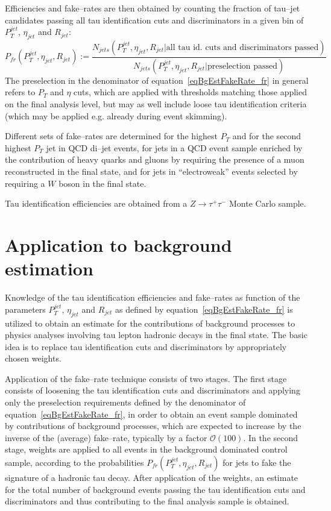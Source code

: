 Efficiencies and fake--rates are then obtained by counting the fraction of tau--jet candidates
passing all tau identification cuts and discriminators
in a given bin of $P_{T}^{jet}$, $\eta_{jet}$ and $R_{jet}$:
\begin{equation}
P_{fr} \left( P_{T}^{jet}, \eta_{jet}, R_{jet} \right) := 
  \frac{N_{jets} \left( P_{T}^{jet}, \eta_{jet}, R_{jet} \vert \mbox{all tau id. cuts and discriminators passed} \right)}
       {N_{jets} \left( P_{T}^{jet}, \eta_{jet}, R_{jet} \vert \mbox{preselection passed} \right)}
\label{eqBgEstFakeRate_fr}
\end{equation}
The preselection in the denominator of equation~\ref{eqBgEstFakeRate_fr} in general refers to $P_{T}$ and $\eta$ cuts,
which are applied with thresholds matching those applied on the final analysis level,
but may as well include loose tau identification criteria (which may be applied e.g. already during event skimming).

Different sets of fake--rates are determined for the highest $P_{T}$ and for the second highest $P_{T}$ jet in QCD di--jet events,
for jets in a QCD event sample enriched by the contribution of heavy quarks and gluons 
by requiring the presence of a muon reconstructed in the final state,
and for jets in ``electroweak'' events selected by requiring a $W$ boson in the final state.

Tau identification efficiencies are obtained from a $Z \rightarrow \tau^{+} \tau^{-}$ Monte Carlo sample.


\section{Application to background estimation}
\label{secFakeRateApplication}

Knowledge of the tau identification efficiencies and fake--rates as function of the parameters $P_{T}^{jet}$, $\eta_{jet}$ and $R_{jet}$ 
as defined by equation~\ref{eqBgEstFakeRate_fr} is utilized to obtain an estimate for the contributions of background processes
to physics analyses involving tau lepton hadronic decays in the final state.
The basic idea is to replace tau identification cuts and discriminators by appropriately chosen weights.

Application of the fake--rate technique consists of two stages.
The first stage consists of loosening the tau identification cuts and discriminators and applying only
the preselection requirements defined by the denominator of equation~\ref{eqBgEstFakeRate_fr},
in order to obtain an event sample dominated by contributions of background processes,
which are expected to increase by the inverse of the (average) fake--rate, typically by a factor $\mathcal{O} \left( 100 \right)$.
In the second stage, weights are applied to all events in the background dominated control sample,
according to the probabilities $P_{fr} \left( P_{T}^{jet}, \eta_{jet}, R_{jet} \right)$ for jets 
to fake the signature of a hadronic tau decay.
After application of the weights, an estimate for the total number of background events
passing the tau identification cuts and discriminators and thus contributing to the final analysis sample is obtained.

